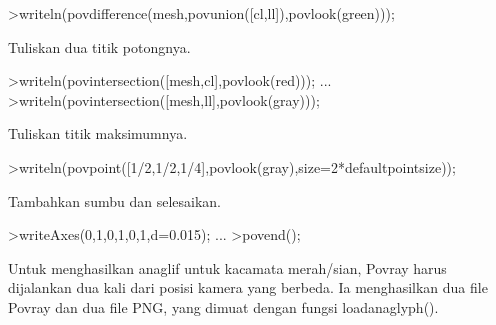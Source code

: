 \documentclass[a4paper,10pt]{article}
\begin{document}
\begin{eulernotebook}
\begin{eulercomment}
\begin{eulercomment}
\begin{eulercomment}
\begin{eulercomment}
\begin{eulercomment}
\begin{eulercomment}
\begin{eulercomment}
\begin{eulercomment}
\begin{eulercomment}
\begin{eulercomment}
\begin{eulercomment}
\begin{eulercomment}
\begin{eulercomment}
\begin{eulercomment}
\begin{eulercomment}
\begin{eulercomment}
\begin{eulercomment}
\begin{eulercomment}
\begin{eulercomment}
\begin{eulercomment}
\begin{eulercomment}
\begin{eulercomment}
\begin{eulercomment}
\begin{eulercomment}
\begin{eulercomment}
\begin{eulercomment}
\begin{eulercomment}
\begin{eulercomment}
\begin{eulercomment}
\begin{eulercomment}
\begin{eulercomment}
\begin{eulercomment}
\begin{eulercomment}
\begin{eulercomment}
\begin{eulercomment}
\begin{eulercomment}
\begin{eulercomment}
\begin{eulercomment}
\begin{eulercomment}
\begin{eulercomment}
\begin{eulerprompt}
>writeln(povdifference(mesh,povunion([cl,ll]),povlook(green)));
\end{eulerprompt}
\begin{eulercomment}
Tuliskan dua titik potongnya.
\end{eulercomment}
\begin{eulerprompt}
>writeln(povintersection([mesh,cl],povlook(red))); ...
>writeln(povintersection([mesh,ll],povlook(gray)));
\end{eulerprompt}
\begin{eulercomment}
Tuliskan titik maksimumnya.
\end{eulercomment}
\begin{eulerprompt}
>writeln(povpoint([1/2,1/2,1/4],povlook(gray),size=2*defaultpointsize));
\end{eulerprompt}
\begin{eulercomment}
Tambahkan sumbu dan selesaikan.
\end{eulercomment}
\begin{eulerprompt}
>writeAxes(0,1,0,1,0,1,d=0.015); ...
>povend();
\end{eulerprompt}
\begin{eulercomment}
Untuk menghasilkan anaglif untuk kacamata merah/sian, Povray harus
dijalankan dua kali dari posisi kamera yang berbeda. Ia menghasilkan
dua file Povray dan dua file PNG, yang dimuat dengan fungsi
loadanaglyph().


\end{eulercomment}
\end{eulercomment}
\end{eulercomment}
\end{eulercomment}
\end{eulercomment}
\end{eulercomment}
\end{eulercomment}
\end{eulercomment}
\end{eulercomment}
\end{eulercomment}
\end{eulercomment}
\end{eulercomment}
\end{eulercomment}
\end{eulercomment}
\end{eulercomment}
\end{eulercomment}
\end{eulercomment}
\end{eulercomment}
\end{eulercomment}
\end{eulercomment}
\end{eulercomment}
\end{eulercomment}
\end{eulercomment}
\end{eulercomment}
\end{eulercomment}
\end{eulercomment}
\end{eulercomment}
\end{eulercomment}
\end{eulercomment}
\end{eulercomment}
\end{eulercomment}
\end{eulercomment}
\end{eulercomment}
\end{eulercomment}
\end{eulercomment}
\end{eulercomment}
\end{eulercomment}
\end{eulercomment}
\end{eulercomment}
\end{eulercomment}
\end{eulercomment}
\end{eulernotebook}
\end{document}
